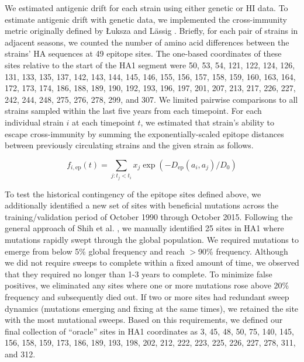 We estimated antigenic drift for each strain using either genetic or HI data.
To estimate antigenic drift with genetic data, we implemented the cross-immunity metric originally defined by {\L}uksza and L\"assig \cite{Luksza:2014hj}.
Briefly, for each pair of strains in adjacent seasons, we counted the number of amino acid differences between the strains' HA sequences at 49 epitope sites.
The one-based coordinates of these sites relative to the start of the HA1 segment were 50, 53, 54, 121, 122, 124, 126, 131, 133, 135, 137, 142, 143, 144, 145, 146, 155, 156, 157, 158, 159, 160, 163, 164, 172, 173, 174, 186, 188, 189, 190, 192, 193, 196, 197, 201, 207, 213, 217, 226, 227, 242, 244, 248, 275, 276, 278, 299, and 307.
We limited pairwise comparisons to all strains sampled within the last five years from each timepoint.
For each individual strain $i$ at each timepoint $t$, we estimated that strain's ability to escape cross-immunity by summing the exponentially-scaled epitope distances between previously circulating strains and the given strain as follows.

\begin{equation}
    f_{i,\mathrm{ep}}(t) = \sum_{j: t_{j} < t_{i}}{x_{j}\exp{(-D_{\mathrm{ep}}(a_{i}, a_{j}) / D_{0})}}
    \label{equation_epitope_cross_immunity}
\end{equation}

To test the historical contingency of the epitope sites defined above, we additionally identified a new set of sites with beneficial mutations across the training/validation period of October 1990 through October 2015.
Following the general approach of Shih et al. \cite{Shih:2007bd}, we manually identified 25 sites in HA1 where mutations rapidly swept through the global population.
We required mutations to emerge from below 5\% global frequency and reach $>$90\% frequency.
Although we did not require sweeps to complete within a fixed amount of time, we observed that they required no longer than 1-3 years to complete.
To minimize false positives, we eliminated any sites where one or more mutations rose above 20\% frequency and subsequently died out.
If two or more sites had redundant sweep dynamics (mutations emerging and fixing at the same times), we retained the site with the most mutational sweeps.
Based on this requirements, we defined our final collection of ``oracle'' sites in HA1 coordinates as 3, 45, 48, 50, 75, 140, 145, 156, 158, 159, 173, 186, 189, 193, 198, 202, 212, 222, 223, 225, 226, 227, 278, 311, and 312.

